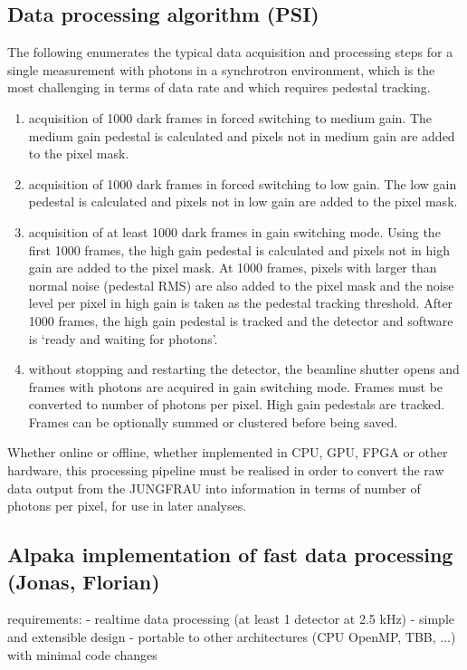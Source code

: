 \documentclass[a4paper]{article}
\begin{document}
\subsection{Data processing algorithm (PSI)}
\label{subsec:alg}
The following enumerates the typical data acquisition and processing steps for a single measurement with photons in a synchrotron environment, which is the most challenging in terms of data rate and which requires pedestal tracking.
\begin{enumerate}
\item acquisition of 1000 dark frames in forced switching to medium gain. The medium gain pedestal is calculated and pixels not in medium gain are added to the pixel mask.
\item acquisition of 1000 dark frames in forced switching to low gain. The low gain pedestal is calculated and pixels not in low gain are added to the pixel mask.
\item acquisition of at least 1000 dark frames in gain switching mode. Using the first 1000 frames, the high gain pedestal is calculated and pixels not in high gain are added to the pixel mask. At 1000 frames, pixels with larger than normal noise (pedestal RMS) are also added to the pixel mask and the noise level per pixel in high gain is taken as the pedestal tracking threshold. After 1000 frames, the high gain pedestal is tracked and the detector and software is `ready and waiting for photons'.
\item without stopping and restarting the detector, the beamline shutter opens and frames with photons are acquired in gain switching mode. Frames must be converted to number of photons per pixel. High gain pedestals are tracked. Frames can be optionally summed or clustered before being saved.
\end{enumerate}
Whether online or offline, whether implemented in CPU, GPU, FPGA or other hardware, this processing pipeline must be realised in order to convert the raw data output from the JUNGFRAU into information in terms of number of photons per pixel, for use in later analyses.


\subsection{Alpaka implementation of fast data processing (Jonas, Florian)}
\label{subsec:alpaka}

requirements:
 - realtime data processing (at least 1 detector at 2.5 kHz)
 - simple and extensible design
 - portable to other architectures (CPU OpenMP, TBB, ...) with minimal code changes
\end{document}

